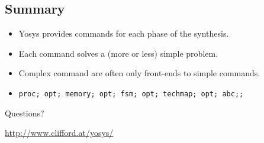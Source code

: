 
\subsection{Summary}

\begin{frame}{\subsecname}
\begin{itemize}
\item Yosys provides commands for each phase of the synthesis.
\item Each command solves a (more or less) simple problem.
\item Complex command are often only front-ends to simple commands.
\item {\tt proc; opt; memory; opt; fsm; opt; techmap; opt; abc;;}
\end{itemize}

\bigskip
\bigskip
\begin{center}
Questions?
\end{center}

\bigskip
\bigskip
\begin{center}
\url{http://www.clifford.at/yosys/}
\end{center}
\end{frame}

